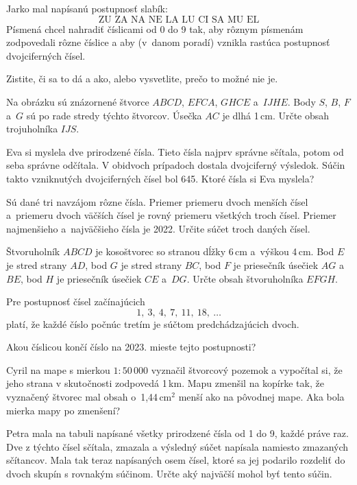 {%
Jarko mal napísanú postupnosť slabík:
$$
\text{ZU ZA NA NE LA LU CI SA MU EL}
$$
Písmená chcel nahradiť číslicami od 0 do 9 tak, aby rôznym písmenám zodpovedali rôzne číslice a aby (v~danom poradí) vznikla rastúca postupnosť dvojciferných čísel.

Zistite, či sa to dá a ako, alebo vysvetlite, prečo to možné nie je.}

{%
Na obrázku sú znázornené štvorce $ABCD$, $EFCA$, $GHCE$ a~$IJHE$.
Body $S$, $B$, $F$ a~$G$ sú po rade stredy týchto štvorcov.
Úsečka $AC$ je dlhá 1\,cm.
Určte obsah trojuholníka $IJS$.
%
}

{%
Eva si myslela dve prirodzené čísla.
Tieto čísla najprv správne sčítala, potom od seba správne odčítala.
V obidvoch prípadoch dostala dvojciferný výsledok.
Súčin takto vzniknutých dvojciferných čísel bol 645.
Ktoré čísla si Eva myslela?}

{%
Sú dané tri navzájom rôzne čísla.
Priemer priemeru dvoch menších čísel a~priemeru dvoch väčších čísel je rovný priemeru všetkých troch čísel.
Priemer najmenšieho a~najväčšieho čísla je 2022.
Určite súčet troch daných čísel.}

{%
Štvoruholník $ABCD$ je kosoštvorec so stranou dĺžky 6\,cm a~výškou 4\,cm.
Bod $E$ je stred strany $AD$,
bod $G$ je stred strany $BC$,
bod $F$ je priesečník úsečiek $AG$ a~$BE$,
bod $H$ je priesečník úsečiek $CE$ a~$DG$.
Určte obsah štvoruholníka $EFGH$.}

{%
Pre postupnosť čísel začínajúcich
$$
1,\ 3,\ 4,\ 7,\ 11,\ 18,\ \dots
$$
platí, že každé číslo počnúc tretím je súčtom predchádzajúcich dvoch.

Akou číslicou končí číslo na 2023. mieste tejto postupnosti?}

{%
Cyril na mape s mierkou $1:50\,000$ vyznačil štvorcový pozemok a vypočítal si, že jeho strana v skutočnosti zodpovedá 1\,km.
Mapu zmenšil na kopírke tak, že vyznačený štvorec mal obsah o~1,44\,cm$^2$ menší ako na pôvodnej mape.
Aka bola mierka mapy po zmenšení?}

{%
Petra mala na tabuli napísané všetky prirodzené čísla od 1 do 9, každé práve raz.
Dve z týchto čísel sčítala, zmazala a výsledný súčet napísala namiesto zmazaných sčítancov.
Mala tak teraz napísaných osem čísel, ktoré sa jej podarilo rozdeliť do dvoch skupín s rovnakým súčinom.
Určte aký najväčší mohol byť tento súčin.}

